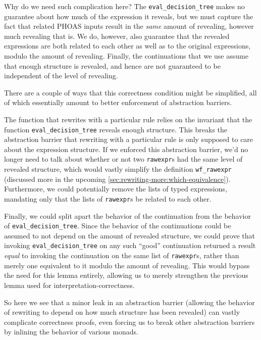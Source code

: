 Why do we need such complication here?
The \texttt{eval_decision_tree} makes no guarantee about how much of the expression it reveals, but we must capture the fact that related PHOAS inputs result in the \emph{same} amount of revealing, however much revealing that is.
We do, however, also guarantee that the revealed expressions are both related to each other as well as to the original expressions, modulo the amount of revealing.
Finally, the continuations that we use assume that enough structure is revealed, and hence are not guaranteed to be independent of the level of revealing.

There are a couple of ways that this correctness condition might be simplified, all of which essentially amount to better enforcement of abstraction barriers.

The function that rewrites with a particular rule relies on the invariant that the function \texttt{eval_decision_tree} reveals enough structure.
This breaks the abstraction barrier that rewriting with a particular rule is only supposed to care about the expression structure.
If we enforced this abstraction barrier, we'd no longer need to talk about whether or not two \texttt{rawexpr}s had the same level of revealed structure, which would vastly simplify the definition \texttt{wf_rawexpr} (discussed more in the upcoming \autoref{sec:rewriting-more:which-equivalence}).
Furthermore, we could potentially remove the lists of typed expressions, mandating only that the lists of \texttt{rawexpr}s be related to each other.

Finally, we could split apart the behavior of the continuation from the behavior of \texttt{eval_decision_tree}.
Since the behavior of the continuations could be assumed to not depend on the amount of revealed structure, we could prove that invoking \texttt{eval_decision_tree} on any such ``good'' continuation returned a result \emph{equal} to invoking the continuation on the same list of \texttt{rawexpr}s, rather than merely one equivalent to it modulo the amount of revealing.
This would bypass the need for this lemma entirely, allowing us to merely strengthen the previous lemma used for interpretation-correctness.

So here we see that a minor leak in an abstraction barrier (allowing the behavior of rewriting to depend on how much structure has been revealed) can vastly complicate correctness proofs, even forcing us to break other abstraction barriers by inlining the behavior of various monads.
\label{sec:break-abstraction:example:eval-decision-tree}

